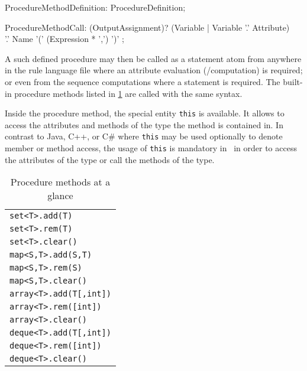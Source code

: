 \begin{rail} 
  ProcedureMethodDefinition: ProcedureDefinition;
\end{rail}

\begin{rail}
  ProcedureMethodCall: (OutputAssignment)? (Variable | Variable '.' Attribute) \\
		'.' Name '(' (Expression * ',') ')' ;
\end{rail}

A such defined procedure may then be called as a statement atom from anywhere in the rule language file where an attribute evaluation (/computation) is required; or even from the sequence computations where a statement is required.
The built-in procedure methods listed in \ref{procmethstab} are called with the same syntax.

Inside the procedure method, the special entity \texttt{this} is available.
It allows to access the attributes and methods of the type the method is contained in.
In contrast to Java, C++, or C\# where \texttt{this} may be used optionally to denote member or method access,
the usage of \texttt{this} is mandatory in \GrG~in order to access the attributes of the type or call the methods of the type.


\begin{table}[htbp]
\centering
\begin{tabular}{|l|}
\hline
\texttt{set<T>.add(T)}\\
\texttt{set<T>.rem(T)}\\
\texttt{set<T>.clear()}\\
\hline
\texttt{map<S,T>.add(S,T)}\\
\texttt{map<S,T>.rem(S)}\\
\texttt{map<S,T>.clear()}\\
\hline
\texttt{array<T>.add(T[,int])}\\
\texttt{array<T>.rem([int])}\\
\texttt{array<T>.clear()}\\
\hline
\texttt{deque<T>.add(T[,int])}\\
\texttt{deque<T>.rem([int])}\\
\texttt{deque<T>.clear()}\\
\hline
\end{tabular}
\caption{Procedure methods at a glance}
\label{procmethstab}
\end{table}


